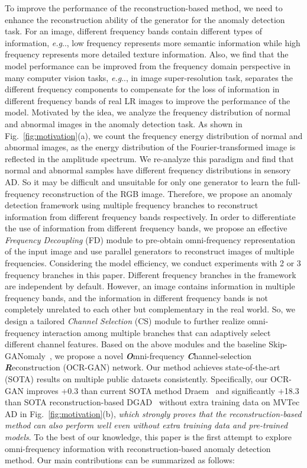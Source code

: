 \documentclass[lettersize,journal]{IEEEtran}
\makeatletter
\DeclareRobustCommand\onedot{\futurelet\@let@token\@onedot}
\def\@onedot{\ifx\@let@token.\else.\null\fi\xspace}
\def\eg{\emph{e.g}\onedot} \def\Eg{\emph{E.g}\onedot}
\makeatother
\begin{document}
To improve the performance of the reconstruction-based method, we need to enhance the reconstruction ability of the generator for the anomaly detection task. For an image, different frequency bands contain different types of information, \eg, low frequency represents more semantic information while high frequency represents more detailed texture information. Also, we find that the model performance can be improved from the frequency domain perspective in many computer vision tasks, \eg, in image super-resolution task, \cite{li2020learning} separates the different frequency components to compensate for the loss of information in different frequency bands of real LR images to improve the performance of the model. Motivated by the idea, we analyze the frequency distribution of normal and abnormal images in the anomaly detection task. As shown in Fig.~\ref{fig:motivation}(a), we count the frequency energy distribution of normal and abnormal images, as the energy distribution of the Fourier-transformed image is reflected in the amplitude spectrum. We re-analyze this paradigm and find that normal and abnormal samples have different frequency distributions in sensory AD. So it may be difficult and unsuitable for only one generator to learn the full-frequency reconstruction of the RGB image. Therefore, we propose an anomaly detection framework using multiple frequency branches to reconstruct information from different frequency bands respectively. In order to differentiate the use of information from different frequency bands, we propose an effective \emph{Frequency Decoupling} (FD) module to pre-obtain omni-frequency representation of the input image and use parallel generators to reconstruct images of multiple frequencies. Considering the model efficiency, we conduct experiments with 2 or 3 frequency branches in this paper. Different frequency branches in the framework are independent by default. However, an image contains information in multiple frequency bands, and the information in different frequency bands is not completely unrelated to each other but complementary in the real world. So, we design a tailored \emph{Channel Selection} (CS) module to further realize omni-frequency interaction among multiple branches that can adaptively select different channel features. Based on the above modules and the baseline Skip-GANomaly~\cite{akccay2019skip}, we propose a novel \textit{\textbf{O}}mni-frequency \textit{\textbf{C}}hannel-selection \textit{\textbf{R}}econstruction (OCR-GAN) network. Our method achieves state-of-the-art (SOTA) results on multiple public datasets consistently. Specifically, our OCR-GAN improves +0.3 than current SOTA method Draem~\cite{zavrtanik2021draem} and significantly +18.3 than SOTA reconstruction-based DGAD~\cite{xia2021discriminative} without extra training data on MVTec AD in Fig.~\ref{fig:motivation}(b), \emph{which strongly proves that the reconstruction-based method can also perform well even without extra training data and pre-trained models}. To the best of our knowledge, this paper is the first attempt to explore omni-frequency information with reconstruction-based anomaly detection method. Our main contributions can be summarized as follows:
\end{document}
